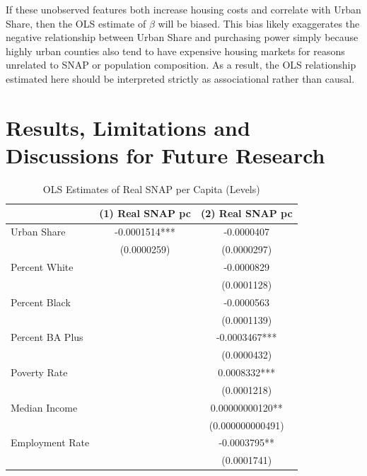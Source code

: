 \documentclass{article}
\begin{document}
If these unobserved features both increase housing costs and correlate with Urban Share, then the OLS estimate of $\beta$ will be biased. This bias likely exaggerates the negative relationship between Urban Share and purchasing power simply because highly urban counties also tend to have expensive housing markets for reasons unrelated to SNAP or population composition. As a result, the OLS relationship estimated here should be interpreted strictly as associational rather than causal. 
\section{Results, Limitations and Discussions for Future Research}

\begin{table}[H]
\centering
\caption{OLS Estimates of Real SNAP per Capita (Levels)}
\begin{tabular}{lcc}
\hline\hline
                    & (1) Real SNAP pc & (2) Real SNAP pc \\
\hline
Urban Share         & -0.0001514***    & -0.0000407       \\
                    & (0.0000259)      & (0.0000297)      \\[4pt]

Percent White       &                  & -0.0000829       \\
                    &                  & (0.0001128)      \\[4pt]

Percent Black       &                  & -0.0000563       \\
                    &                  & (0.0001139)      \\[4pt]

Percent BA Plus     &                  & -0.0003467***    \\
                    &                  & (0.0000432)      \\[4pt]

Poverty Rate        &                  & 0.0008332***     \\
                    &                  & (0.0001218)      \\[4pt]

Median Income       &                  & 0.00000000120**  \\
                    &                  & (0.000000000491) \\[4pt]

Employment Rate     &                  & -0.0003795**     \\
                    &                  & (0.0001741)      \\[4pt]


\end{tabular}
\end{table}
\end{document}
